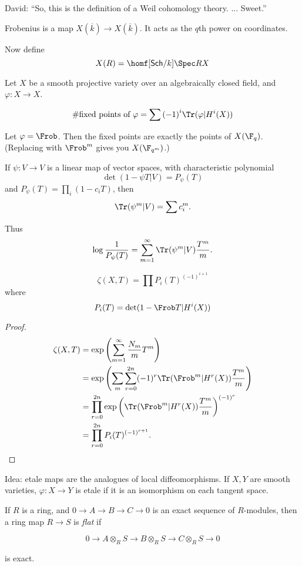 \documentclass{scrreprt}
\begin{document}
David: ``So, this is the definition of a Weil cohomology theory. ... Sweet.''

Frobenius is a map $X(\overline k)\to X(\overline k)$. It acts as the $q$th
power on coordinates.

Now define
$$X(R) = \homf[{\sf{Sch}}/k]{\Spec R}X$$

Let $X$ be a smooth projective variety over an algebraically closed field, and
$\varphi:X\to X$.

$$\#\text{fixed points of }\varphi = \sum {(-1)}^i \Tr(\varphi |H^i(X))$$

Let $\varphi = \Frob$. Then the fixed points are exactly the points of
$X(\F_q)$. (Replacing with $\Frob^m$ gives you $X(\F_{q^m})$.)

\begin{lem}
  If $\psi:V\to V$ is a linear map of vector spaces,
  with characteristic polynomial
  $$\det(1-\psi T|V)=P_\psi(T)$$
  and $P_\psi(T) = \prod_i(1-c_i T)$, then
  $$\Tr(\psi^m|V) = \sum c_i^m.$$

  Thus $$\log\frac1{P_\psi(T)} = \sum_{m=1}^\infty \Tr(\psi^m|V)\frac{T^m}m.$$
\end{lem}

\begin{thm}
  $$\zeta(X,T) = \prod P_i(T)^{(-1)^{i+1}}$$
  where
  $$P_i(T) = \det(1-\Frob T|H^i(X))$$
\end{thm}

\begin{proof}
  \begin{align}
   \zeta(X,T) &= \exp\left(\sum_{m=1}^\infty \frac{N_m}m T^m\right) \\
              &= \exp\left( \sum_m \sum_{r=0}^{2n} (-1)^r \Tr(\Frob^m | H^r(X)) \frac{T^m}m \right)\\
              &= \prod_{r=0}^{2n} \exp\left( \Tr(\Frob^m | H^r(X)) \frac{T^m}m \right)^{{(-1)}^r} \\
              &= \prod_{r=0}^{2n} P_i(T)^{{(-1)}^{r+1}}.
  \end{align}
\end{proof}

Idea: etale maps are the analogues of local diffeomorphisms. If $X,Y$ are smooth
varieties, $\varphi:X\to Y$ is etale if it is an isomorphism on each tangent
space.

\begin{defn}
 If $R$ is a ring, and $0\to A\to B\to C\to 0$ is an exact sequence of
 $R$-modules, then a ring map $R\to S$ is \textit{flat} if

 $$0\to A\otimes_R S\to B\otimes_R S\to C\otimes_R S\to 0$$

 is exact.
\end{defn}
\end{document}
